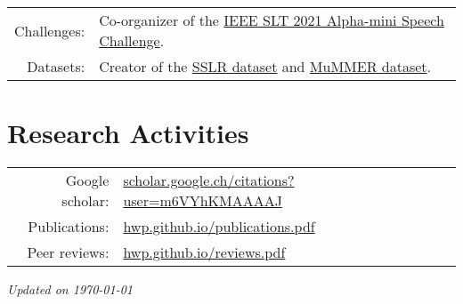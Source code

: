 \documentclass[a4paper,9pt]{extarticle} %
\begin{document}
\begin{tabular}{rl}
  Challenges: & Co-organizer of the \href{http://asc.ubtrobot.com/}{IEEE SLT 2021 Alpha-mini Speech Challenge}. \\
  Datasets:   & Creator of the \href{https://www.idiap.ch/dataset/sslr}{SSLR dataset} and \href{https://www.idiap.ch/dataset/mummer}{MuMMER dataset}. \\
\end{tabular}

\fi

\section{Research Activities}

\begin{tabular}{rl}
  Google scholar: & \href{https://scholar.google.ch/citations?user=m6VYhKMAAAAJ&hl=en}{scholar.google.ch/citations?user=m6VYhKMAAAAJ} \\
  Publications: & \href{http://hwp.github.io/publications.pdf}{hwp.github.io/publications.pdf} \\
  Peer reviews: & \href{http://hwp.github.io/reviews.pdf}{hwp.github.io/reviews.pdf} \\
\end{tabular}



\vfill
\centering \footnotesize \itshape{Updated on \today}
\end{document}
